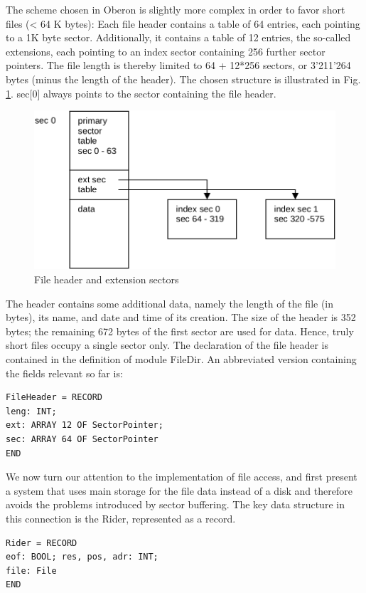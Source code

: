 The scheme chosen in Oberon is slightly more complex in order to favor short files (< 64 K
bytes): Each file header contains a table of 64 entries, each pointing to a 1K byte sector.
Additionally, it contains a table of 12 entries, the so-called extensions, each pointing to an index
sector containing 256 further sector pointers. The file length is thereby limited to 64 + 12*256
sectors, or 3'211'264 bytes (minus the length of the header). The chosen structure is illustrated in
Fig. \ref{fig:file-header}. sec[0] always points to the sector containing the file header.
\begin{figure}
	\label{fig:file-header}
	\centering
	\includegraphics[width=\textwidth]{i/l}
	\caption{File header and extension sectors}
\end{figure}

The header contains some additional data, namely the length of the file (in bytes), its name, and
date and time of its creation. The size of the header is 352 bytes; the remaining 672 bytes of the
first sector are used for data. Hence, truly short files occupy a single sector only. The declaration
of the file header is contained in the definition of module FileDir. An abbreviated version
containing the fields relevant so far is:
\begin{verbatim}
FileHeader = RECORD
leng: INT;
ext: ARRAY 12 OF SectorPointer;
sec: ARRAY 64 OF SectorPointer
END
\end{verbatim}

We now turn our attention to the implementation of file access, and first present a system that
uses main storage for the file data instead of a disk and therefore avoids the problems introduced
by sector buffering. The key data structure in this connection is the Rider, represented as a
record.
\begin{verbatim}
Rider = RECORD
eof: BOOL; res, pos, adr: INT;
file: File
END
\end{verbatim}

